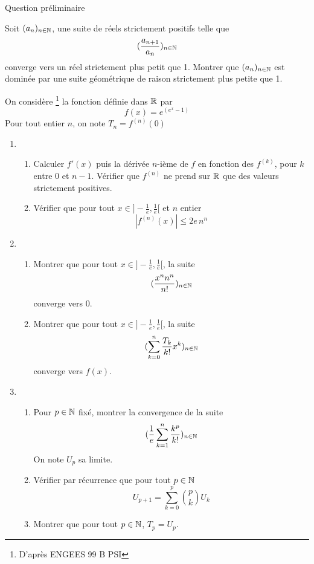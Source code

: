 Question pr{\'e}liminaire

Soit $(a_n)_{n\in \mathbb{N}}$, une suite de r{\'e}els strictement
positifs telle que
\[(\frac{a_{n+1}}{a_n})_{n\in \mathbb{N}}\]
converge vers un r{\'e}el strictement plus petit que 1.\newline
Montrer que $(a_n)_{n\in \mathbb{N}}$ est domin{\'e}e par une suite
g{\'e}om{\'e}trique de raison strictement plus petite que 1. 


On consid{\`e}re \footnote{D'apr{\`e}s ENGEES 99 B PSI} la fonction
d{\'e}finie dans $\mathbb{R}$ par
$$f(x)=e^{(e^{x}-1)}$$
Pour tout entier $n$, on note $T_{n}=f^{(n)}(0)$
\begin{enumerate}
\item \begin{enumerate}
    \item Calculer $f'(x)$ puis la d{\'e}riv{\'e}e $n$-i{\`e}me de $f$ en fonction des $f^{(k)}$, pour $k$ entre 0 et $n-1$. V{\'e}rifier que $f^{(n)}$ ne prend sur $\mathbb{R}$ que des valeurs strictement positives.
    \item V{\'e}rifier que pour tout $x \in ]-\frac{1}{e},\frac{1}{e}[$ et $n$ entier
$$|f^{(n)}(x)|\leq 2e\,n^{n}$$
    \end{enumerate}
\item\begin{enumerate}
\item Montrer que pour tout $x \in ]-\frac{1}{e},\frac{1}{e}[$, la suite $$(\frac{x^{n}n^{n}}{n!})_{n\in \mathbb{N}}$$
converge vers 0.
\item Montrer que pour tout $x \in ]-\frac{1}{e},\frac{1}{e}[$, la suite $$(\sum_{k=0}^{n}\frac{T_{k} }{k!} x^{k})_{n\in \mathbb{N}}$$
converge vers $f(x)$.
    \end{enumerate}
\item\begin{enumerate}
    \item Pour $p \in \mathbb{N}$ fix{\'e}, montrer la convergence de la suite
$$(\frac{1}{e}\sum_{k=1}^{n}\frac{k^{p}}{k !})_{n\in \mathbb{N}}$$
On note $U_{p}$ sa limite.
    \item V{\'e}rifier par r{\'e}currence que pour tout $p \in \mathbb{N}$
$$U_{p+1}=\sum_{k=0}^{p}\binom{p}{k} U_{k}$$
    \item Montrer que pour tout $p \in \mathbb{N}$, $T_{p}=U_{p}$.
    \end{enumerate}

\end{enumerate}
